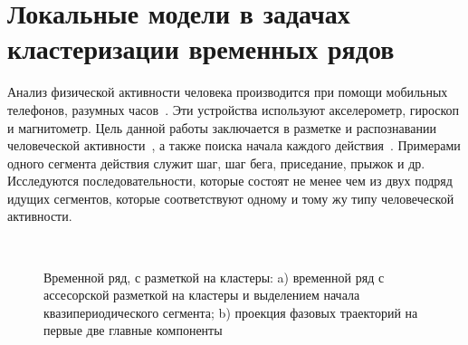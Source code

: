 \newpage


\section{Локальные модели в задачах кластеризации временных рядов}
Анализ физической активности человека производится при помощи мобильных телефонов, разумных часов~\cite{kwapisz2010, wang2014}. 
Эти устройства используют акселерометр, гироскоп и магнитометр. 
Цель данной работы заключается в  разметке и распознавании человеческой активности~\cite{Ignatov2015, Olivares2012, cinar2018}, а также поиска начала каждого действия~\cite{motrenko2015}. 
Примерами одного сегмента действия служит шаг, шаг бега, приседание, прыжок и др. 
Исследуются последовательности, которые состоят не менее чем из двух подряд идущих сегментов, которые соответствуют одному и тому жу типу человеческой активности.

\begin{figure}[h!t]\center
{}
\\
\caption{Временной ряд, с разметкой на кластеры: a) временной ряд с ассесорской разметкой на кластеры и выделением начала квазипериодического сегмента; b) проекция фазовых траекторий на первые две главные компоненты }
\end{figure}

